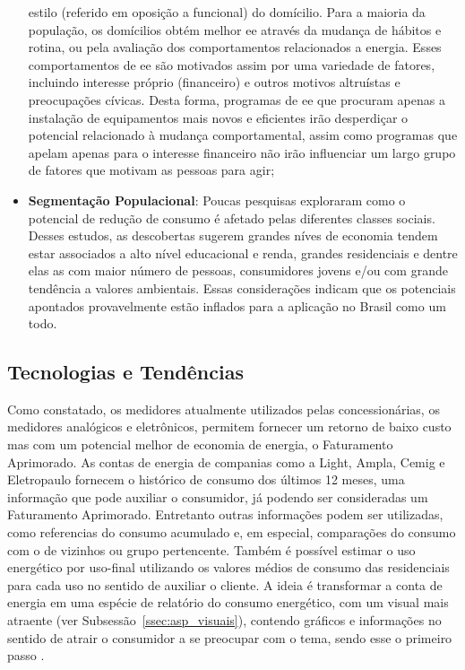 \begin{itemize}
estilo (referido em oposição a funcional) do domícilio. Para a maioria da
população, os domícilios obtém melhor \gls{ee} através da mudança de hábitos e 
rotina, ou pela avaliação dos comportamentos relacionados a energia. Esses
comportamentos de \gls{ee} são motivados assim por uma variedade de fatores,
incluindo interesse próprio (financeiro) e outros motivos altruístas e
preocupações cívicas. Desta forma, programas de \gls{ee} que procuram apenas 
a instalação de equipamentos mais novos e eficientes irão 
desperdiçar o potencial relacionado à mudança comportamental, assim como
programas que apelam apenas para o interesse financeiro não irão influenciar um
largo grupo de fatores que motivam as pessoas para agir;
\item \textbf{Segmentação Populacional}: Poucas pesquisas exploraram como o
potencial de redução de consumo é afetado pelas diferentes classes sociais.
Desses estudos, as descobertas sugerem grandes níves de economia tendem estar
associados a alto nível educacional e renda, grandes residenciais e dentre elas
as com maior número de pessoas, consumidores jovens e/ou com grande tendência a
valores ambientais. Essas considerações indicam que os potenciais apontados
provavelmente estão inflados para a aplicação no Brasil como um todo.
\end{itemize} 

\subsection{Tecnologias e Tendências}
\label{ssec:ret_tec}

Como constatado, os medidores atualmente utilizados pelas 
concessionárias, os medidores analógicos e eletrônicos, permitem fornecer um 
retorno de baixo custo mas com um potencial melhor de economia de energia, 
o Faturamento Aprimorado. As contas de energia de companias como a Light,
Ampla, Cemig e Eletropaulo fornecem o histórico de consumo dos últimos 12 meses,
uma informação que pode auxiliar o consumidor, já podendo ser consideradas um 
Faturamento Aprimorado. Entretanto outras informações podem ser utilizadas, 
como referencias do consumo acumulado e, em especial, comparações do consumo 
com o de vizinhos ou grupo pertencente. Também é possível estimar o uso 
energético por uso-final utilizando os valores médios de consumo das residenciais
para cada uso no sentido de auxiliar o cliente. A ideia é
transformar a conta de energia em uma espécie de relatório do consumo energético,
com um visual mais atraente (ver Subsessão~\ref{ssec:asp_visuais}), 
contendo gráficos e informações no sentido de atrair o consumidor a se 
preocupar com o tema, sendo esse o primeiro passo \cite{2009_epri}.

